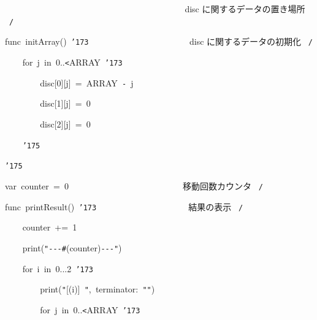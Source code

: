 \documentclass{article}
\begin{document}
\noindent
\mbox{}{\tt\mc \ \ \ \ \ \ \ \ }{\tt\mc \ \ \ \ \ \ \ \ }{\tt\mc \ \ \ \ \ \ \ \ }{\tt\mc \ \ \ \ \ \ \ \ }{\tt\mc \ \ \ \ \ \ \ \ }\rm\mc {\tt /}{\tt *}\  {}disc に関するデータの置き場所
					   \hfill \rm\mc \ {\tt *}{\tt /}
\tt\mc 

\noindent
\mbox{}\hfill

\noindent
\mbox{}func{\tt\mc \ }initArray(){\tt\mc \ }{\tt\char'173}{\tt\mc \ \ \ \ \ \ }{\tt\mc \ \ \ \ \ \ \ \ }{\tt\mc \ \ \ \ \ \ \ \ }\rm\mc {\tt /}{\tt *}\  {}disc に関するデータの初期化
					   \hfill \rm\mc \ {\tt *}{\tt /}
\tt\mc 

\noindent
\mbox{}{\tt\mc \ \ \ \ }for{\tt\mc \ }j{\tt\mc \ }in{\tt\mc \ }0..{\tt <}ARRAY{\tt\mc \ }{\tt\char'173}

\noindent
\mbox{}{\tt\mc \ \ \ \ \ \ \ \ }disc[0][j]{\tt\mc \ }={\tt\mc \ }ARRAY{\tt\mc \ }{\tt -}{\tt\mc \ }j

\noindent
\mbox{}{\tt\mc \ \ \ \ \ \ \ \ }disc[1][j]{\tt\mc \ }={\tt\mc \ }0

\noindent
\mbox{}{\tt\mc \ \ \ \ \ \ \ \ }disc[2][j]{\tt\mc \ }={\tt\mc \ }0

\noindent
\mbox{}{\tt\mc \ \ \ \ }{\tt\char'175}

\noindent
\mbox{}{\tt\char'175}

\noindent
\mbox{}\hfill

\noindent
\mbox{}var{\tt\mc \ }counter{\tt\mc \ }={\tt\mc \ }0{\tt\mc \ }{\tt\mc \ \ \ \ \ \ \ \ }{\tt\mc \ \ \ \ \ \ \ \ }{\tt\mc \ \ \ \ \ \ \ \ }\rm\mc {\tt /}{\tt *}\  {}移動回数カウンタ \hfill \rm\mc \ {\tt *}{\tt /}
\tt\mc 

\noindent
\mbox{}\hfill

\noindent
\mbox{}func{\tt\mc \ }printResult(){\tt\mc \ }{\tt\char'173}{\tt\mc \ \ \ \ }{\tt\mc \ \ \ \ \ \ \ \ }{\tt\mc \ \ \ \ \ \ \ \ }\rm\mc {\tt /}{\tt *}\  {}結果の表示 \hfill \rm\mc \ {\tt *}{\tt /}
\tt\mc 

\noindent
\mbox{}{\tt\mc \ \ \ \ }counter{\tt\mc \ }+={\tt\mc \ }1

\noindent
\mbox{}{\tt\mc \ \ \ \ }print({\tt "}{\tt -}{\tt -}{\tt -}{\tt\#}{\tt{}}(counter){\tt -}{\tt -}{\tt -}{\tt "})

\noindent
\mbox{}{\tt\mc \ \ \ \ }for{\tt\mc \ }i{\tt\mc \ }in{\tt\mc \ }0...2{\tt\mc \ }{\tt\char'173}

\noindent
\mbox{}{\tt\mc \ \ \ \ \ \ \ \ }print({\tt "}[{\tt{}}(i)]{\tt\mc \ }{\tt "},{\tt\mc \ }terminator:{\tt\mc \ }{\tt "}{\tt "})

\noindent
\mbox{}{\tt\mc \ \ \ \ \ \ \ \ }for{\tt\mc \ }j{\tt\mc \ }in{\tt\mc \ }0..{\tt <}ARRAY{\tt\mc \ }{\tt\char'173}
\end{document}
